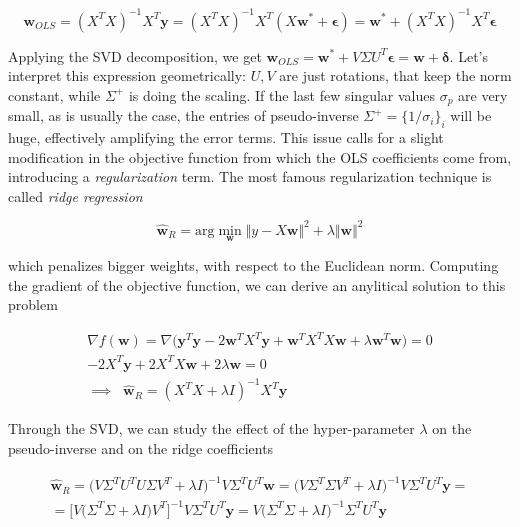 \documentclass{article}
\numberwithin{equation}{subsection}
\begin{document}
\begin{equation*}
    \textbf{w}_{OLS} = (X^TX)^{-1}X^T \textbf{y} = (X^TX)^{-1}X^T (X\textbf{w}^* + \boldsymbol{\epsilon}) = \textbf{w}^* + (X^TX)^{-1}X^T \boldsymbol{\epsilon}
\end{equation*}

Applying the SVD decomposition, we get $\textbf{w}_{OLS} = \textbf{w}^* + V \Sigma U^T\boldsymbol{\epsilon} = \textbf{w}+\boldsymbol{\delta}$. Let's interpret this expression geometrically: $U,V$ are just rotations, that keep the norm constant, while $\Sigma^+$ is doing the scaling. If the last few singular values $\sigma_p$ are very small, as is usually the case, the entries of pseudo-inverse $\Sigma^+ = \{ 1/\sigma_i \}_i$ will be huge, effectively amplifying the error terms. This issue calls for a slight modification in the objective function from which the OLS coefficients come from, introducing a \textit{regularization} term. The most famous regularization technique is called \textit{ridge regression}

\begin{equation*}
    \hat{\textbf{w}}_R = \text{arg}\min_{\textbf{w}} \Vert y - X \textbf{w} \Vert^2 + \lambda \Vert \textbf{w} \Vert^2
\end{equation*}

which penalizes bigger weights, with respect to the Euclidean norm. Computing the gradient of the objective function, we can derive an anylitical solution to this problem

\begin{gather*}
    \nabla f(\textbf{w}) = \nabla \Big( \textbf{y}^T \textbf{y} - 2 \textbf{w}^T X^T \textbf{y} + \textbf{w}^T X^T X \textbf{w} + \lambda \textbf{w}^T \textbf{w}\Big) = 0 \\
    -2 X^T \textbf{y} + 2 X^T X \textbf{w} + 2\lambda \textbf{w} = 0 \\
    \implies \;\; \hat{\textbf{w}}_R = (X^T X + \lambda I)^{-1} X^T \textbf{y}
\end{gather*}

Through the SVD, we can study the effect of the hyper-parameter $\lambda$ on the pseudo-inverse and on the ridge coefficients 

\begin{gather*}
    \hat{\textbf{w}}_R = \big( V \Sigma^T U^T U \Sigma V^T + \lambda I \big)^{-1} V \Sigma^T U^T \textbf{w} = \big( V \Sigma^T \Sigma V^T + \lambda I \big)^{-1} V \Sigma^T U^T \textbf{y} = \\
    = \Big[ V \Big( \Sigma^T \Sigma + \lambda I \Big) V^T \Big]^{-1} V \Sigma^T U^T \textbf{y} = V \Big( \Sigma^T \Sigma + \lambda I \Big)^{-1} \Sigma^T U^T \textbf{y}
\end{gather*}
\end{document}
